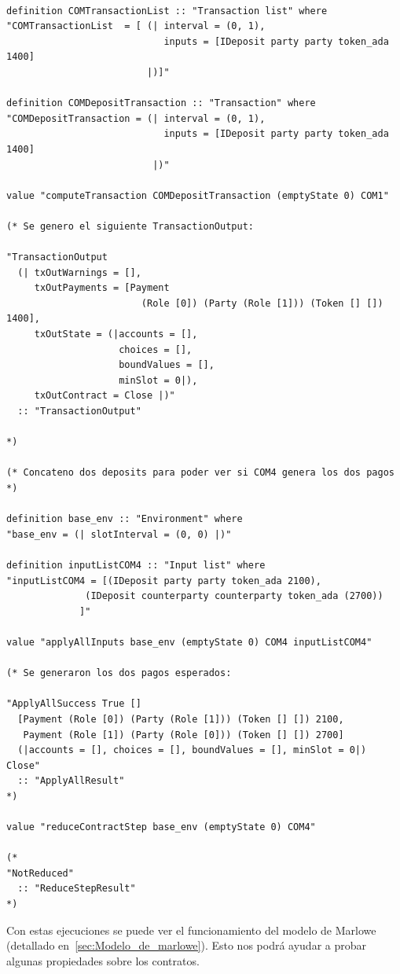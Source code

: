 \documentclass[12pt]{book}
\begin{document}
\begin{lstlisting}[style=Isabelle]

definition COMTransactionList :: "Transaction list" where
"COMTransactionList  = [ (| interval = (0, 1), 
                            inputs = [IDeposit party party token_ada 1400] 
                         |)]"

definition COMDepositTransaction :: "Transaction" where
"COMDepositTransaction = (| interval = (0, 1),
                            inputs = [IDeposit party party token_ada 1400]
                          |)"

value "computeTransaction COMDepositTransaction (emptyState 0) COM1"

(* Se genero el siguiente TransactionOutput:

"TransactionOutput
  (| txOutWarnings = [], 
     txOutPayments = [Payment 
                        (Role [0]) (Party (Role [1])) (Token [] []) 1400],
     txOutState = (|accounts = [], 
                    choices = [], 
                    boundValues = [], 
                    minSlot = 0|),
     txOutContract = Close |)"
  :: "TransactionOutput"

*)

(* Concateno dos deposits para poder ver si COM4 genera los dos pagos *)

definition base_env :: "Environment" where
"base_env = (| slotInterval = (0, 0) |)"

definition inputListCOM4 :: "Input list" where
"inputListCOM4 = [(IDeposit party party token_ada 2100),
              (IDeposit counterparty counterparty token_ada (2700))
             ]"

value "applyAllInputs base_env (emptyState 0) COM4 inputListCOM4"

(* Se generaron los dos pagos esperados:

"ApplyAllSuccess True []
  [Payment (Role [0]) (Party (Role [1])) (Token [] []) 2100,
   Payment (Role [1]) (Party (Role [0])) (Token [] []) 2700]
  (|accounts = [], choices = [], boundValues = [], minSlot = 0|) Close"
  :: "ApplyAllResult"
*)

value "reduceContractStep base_env (emptyState 0) COM4"

(*
"NotReduced"
  :: "ReduceStepResult"
*)
\end{lstlisting}

Con estas ejecuciones se puede ver el funcionamiento del modelo de Marlowe (detallado en~\ref{sec:Modelo_de_marlowe}). Esto nos podrá ayudar a probar algunas propiedades sobre los contratos.
\end{document}
